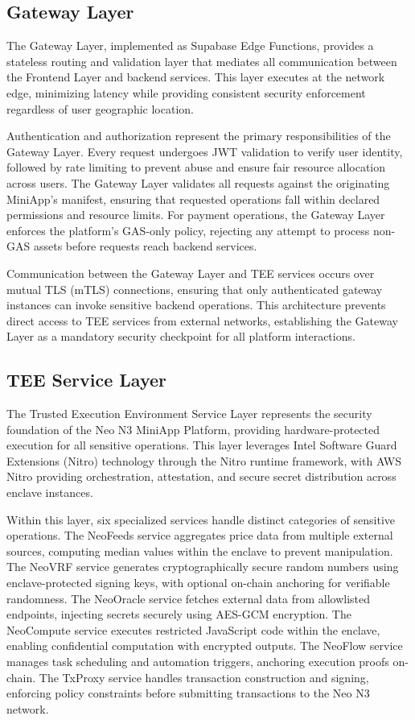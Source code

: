 \documentclass[11pt,a4paper]{article}
\begin{document}
\subsection{Gateway Layer}

The Gateway Layer, implemented as Supabase Edge Functions, provides a stateless routing and validation layer that mediates all communication between the Frontend Layer and backend services. This layer executes at the network edge, minimizing latency while providing consistent security enforcement regardless of user geographic location.

Authentication and authorization represent the primary responsibilities of the Gateway Layer. Every request undergoes JWT validation to verify user identity, followed by rate limiting to prevent abuse and ensure fair resource allocation across users. The Gateway Layer validates all requests against the originating MiniApp's manifest, ensuring that requested operations fall within declared permissions and resource limits. For payment operations, the Gateway Layer enforces the platform's GAS-only policy, rejecting any attempt to process non-GAS assets before requests reach backend services.

Communication between the Gateway Layer and TEE services occurs over mutual TLS (mTLS) connections, ensuring that only authenticated gateway instances can invoke sensitive backend operations. This architecture prevents direct access to TEE services from external networks, establishing the Gateway Layer as a mandatory security checkpoint for all platform interactions.

\subsection{TEE Service Layer}

The Trusted Execution Environment Service Layer represents the security foundation of the Neo N3 MiniApp Platform, providing hardware-protected execution for all sensitive operations. This layer leverages Intel Software Guard Extensions (Nitro) technology through the Nitro runtime framework, with AWS Nitro providing orchestration, attestation, and secure secret distribution across enclave instances.

Within this layer, six specialized services handle distinct categories of sensitive operations. The NeoFeeds service aggregates price data from multiple external sources, computing median values within the enclave to prevent manipulation. The NeoVRF service generates cryptographically secure random numbers using enclave-protected signing keys, with optional on-chain anchoring for verifiable randomness. The NeoOracle service fetches external data from allowlisted endpoints, injecting secrets securely using AES-GCM encryption. The NeoCompute service executes restricted JavaScript code within the enclave, enabling confidential computation with encrypted outputs. The NeoFlow service manages task scheduling and automation triggers, anchoring execution proofs on-chain. The TxProxy service handles transaction construction and signing, enforcing policy constraints before submitting transactions to the Neo N3 network.
\end{document}
